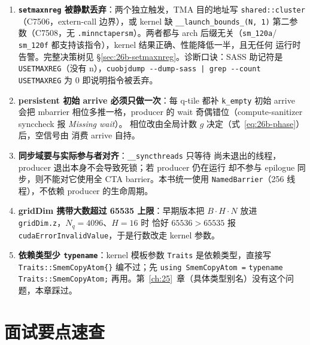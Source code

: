 \begin{enumerate}[itemsep=2pt]
  \item \textbf{\texttt{setmaxnreg} 被静默丢弃}：两个独立触发，TMA 目的地址写
        \texttt{shared::cluster}（C7506，extern-call 边界），或 kernel 缺
        \texttt{\_\_launch\_\allowbreak{}bounds\_\allowbreak{}(N,~1)} 第二参数（C7508，无
        \texttt{.minnctapersm}）。两者都与 arch 后缀无关（\texttt{sm\_120a}/
        \texttt{sm\_120f} 都支持该指令），kernel 结果正确、性能降低一半，且无任何
        运行时告警。完整决策树见 \S\ref{sec:26b-setmaxnreg}。诊断口诀：SASS
        助记符是 \texttt{USETMAXREG}（没有 n），\texttt{cuobjdump -{}-dump-sass |
        grep -{}-count USETMAXREG} 为 0 即说明指令被丢弃。
  \item \textbf{persistent 初始 arrive 必须只做一次}：每 q-tile 都补
        \texttt{k\_empty} 初始 arrive 会把 mbarrier 相位多推一格，producer 的
        wait 奇偶错位（compute-sanitizer synccheck 报 \emph{Missing wait}）。
        相位改由全局计数 $g$ 决定（式~\eqref{eq:26b-phase}）后，空信号由
        消费 arrive 自持。
  \item \textbf{同步域要与实际参与者对齐}：\texttt{\_\_syncthreads} 只等待
        尚未退出的线程，producer 退出本身不会导致死锁；若 producer 仍在运行
        却不参与 epilogue 同步，则不能对它使用全 CTA barrier。本书统一使用
        \texttt{NamedBarrier}（256 线程），不依赖 producer 的生命周期。
  \item \textbf{gridDim 携带大数超过 65535 上限}：早期版本把
        $B\cdot H\cdot N$ 放进 \texttt{gridDim.z}，$N_q{=}4096$、$H{=}16$ 时
        恰好 $65536 > 65535$ 报 \texttt{cudaErrorInvalidValue}，于是行数改走
        kernel 参数。
  \item \textbf{依赖类型少 \texttt{typename}}：kernel 模板参数
        \texttt{Traits} 是依赖类型，直接写
        \texttt{Traits::SmemCopyAtom\{\}} 编不过；先
        \texttt{using SmemCopyAtom =} \texttt{typename Traits::SmemCopyAtom;}
        再用。第~\ref{ch:25}~章（具体类型别名）没有这个问题，本章踩过。
\end{enumerate}

\section{面试要点速查}\label{sec:26b-interview}

